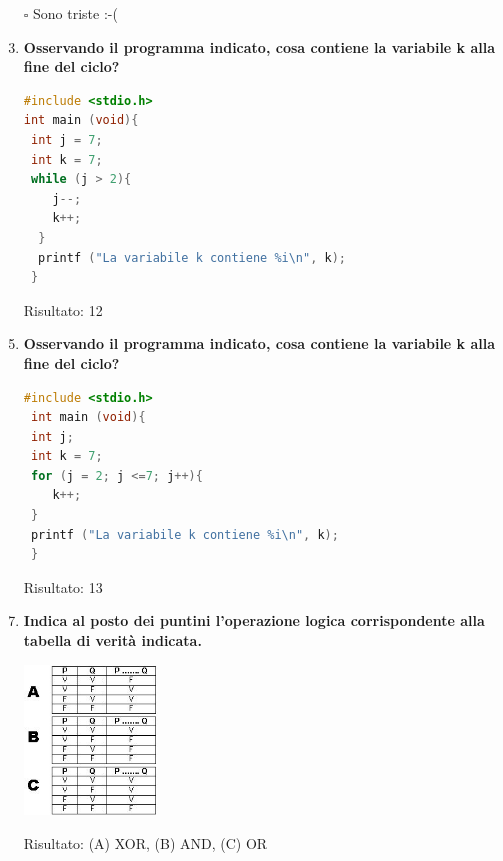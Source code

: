 \documentclass[11pt]{article}
\begin{document}
\begin{enumerate}
  \begin{lstlisting}[language=c]
   #include <stdio.h>
    int main (void){
    int x = 4;
    if (x % 2){
    	printf ("Sono felice :-)\n");
    }else{
    	printf ("Sono triste :-(\n");
     }
  }
 \end{lstlisting}   
 \item[$\square$] Sono triste :-(

\item [\nonumber]
\item {\bf Osservando il programma indicato, cosa contiene la variabile k alla fine del ciclo?}

 \begin{lstlisting}[language=c]
#include <stdio.h>
int main (void){
 int j = 7;
 int k = 7; 
 while (j > 2){
  	j--;
   	k++;
  }
  printf ("La variabile k contiene %i\n", k);
 }
\end{lstlisting}   

Risultato: 12
\item [\nonumber]
\item {\bf Osservando il programma indicato, cosa contiene la variabile k alla fine del ciclo?}
\begin{lstlisting}[language=c]
#include <stdio.h>
 int main (void){
 int j;
 int k = 7;
 for (j = 2; j <=7; j++){
 	k++;
 }
 printf ("La variabile k contiene %i\n", k);
 }
\end{lstlisting} 

Risultato: 13
\item [\nonumber]
\item{\bf Indica al posto dei puntini l'operazione logica corrispondente alla tabella di verit\`{a} indicata.}
\begin{center}
\includegraphics[width=0.28\textwidth]{mm11_connettivi}
\end{center}

Risultato: (A) XOR, (B) AND, (C) OR



\end{enumerate}
\end{document}
